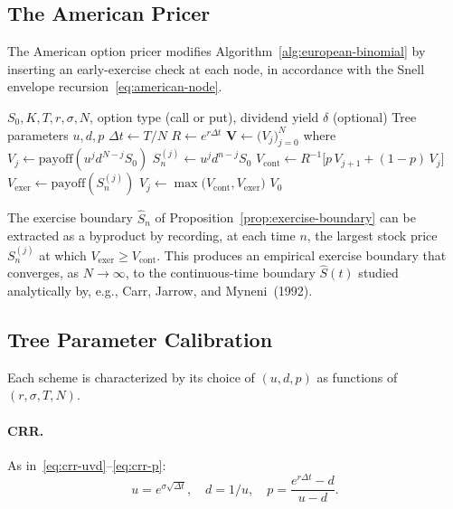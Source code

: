 \documentclass[11pt,a4paper]{article}
\theoremstyle{plain}
\theoremstyle{definition}
\begin{document}
\subsection{The American Pricer}
\label{subsec:american-pricer}

The American option pricer modifies Algorithm~\ref{alg:european-binomial}
by inserting an early-exercise check at each node, in accordance with
the Snell envelope recursion~\eqref{eq:american-node}.

\begin{algorithm}[H]
\caption{American call/put pricing via backward induction}
\label{alg:american-binomial}
\begin{algorithmic}[1]
\Require $S_0, K, T, r, \sigma, N$, option type (call or put), dividend yield $\delta$ (optional)
\Require Tree parameters $u, d, p$
\State $\Delta t \gets T / N$
\State $R \gets e^{r \Delta t}$
\State $\mathbf{V} \gets \bigl(V_j\bigr)_{j=0}^{N}$ where
       $V_j \gets \mathrm{payoff}(u^j d^{N-j} S_0)$
        \State $S_n^{(j)} \gets u^j d^{n-j} S_0$
        \State $V_{\mathrm{cont}} \gets R^{-1}\bigl[p\, V_{j+1} + (1-p)\, V_j\bigr]$
        \State $V_{\mathrm{exer}} \gets \mathrm{payoff}(S_n^{(j)})$
        \State $V_j \gets \max\bigl(V_{\mathrm{cont}}, V_{\mathrm{exer}}\bigr)$
    \EndFor
\EndFor
\State \Return $V_0$
\end{algorithmic}
\end{algorithm}

The exercise boundary $\hat{S}_n$ of
Proposition~\ref{prop:exercise-boundary} can be extracted as a byproduct
by recording, at each time $n$, the largest stock price $S_n^{(j)}$ at
which $V_{\mathrm{exer}} \geq V_{\mathrm{cont}}$. This produces an
empirical exercise boundary that converges, as $N \to \infty$, to the
continuous-time boundary $\hat{S}(t)$ studied analytically by, e.g.,
Carr, Jarrow, and Myneni~(1992).

\subsection{Tree Parameter Calibration}
\label{subsec:tree-calibration}

Each scheme is characterized by its choice of $(u, d, p)$ as functions of
$(r, \sigma, T, N)$.

\paragraph{CRR.} As in~\eqref{eq:crr-uvd}--\eqref{eq:crr-p}:
\[
u = e^{\sigma\sqrt{\Delta t}}, \quad d = 1/u, \quad
p = \frac{e^{r\Delta t} - d}{u - d}.
\]
\end{document}
